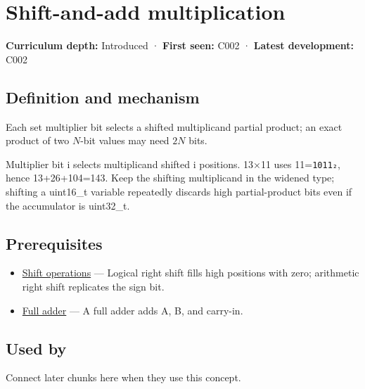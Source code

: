 \hypertarget{appendix-a65290d66ed9}{}\label{referencestart:appendix-a65290d66ed9}
\section{Shift-and-add multiplication}\label{appendix-a65290d66ed9-shift-and-add-multiplication}

\textbf{Curriculum depth:} Introduced · \textbf{First seen:} C002 · \textbf{Latest development:} C002

\begin{allmightroledefinition}

\subsection{Definition and mechanism}\label{appendix-a65290d66ed9-definition-and-mechanism}

Each set multiplier bit selects a shifted multiplicand partial product; an exact product of two \(N\)-bit values may need \(2N\) bits.

\end{allmightroledefinition}

Multiplier bit i selects multiplicand shifted i positions. 13×11 uses 11=\texttt{1011₂}, hence 13+26+104=143. Keep the shifting multiplicand in the widened type; shifting a uint16\_t variable repeatedly discards high partial-product bits even if the accumulator is uint32\_t.

\subsection{Prerequisites}\label{appendix-a65290d66ed9-prerequisites}

\begin{itemize}
\tightlist
\item
  \hyperref[appendix-73425b25118e]{Shift operations} --- Logical right shift fills high positions with zero; arithmetic right shift replicates the sign bit.
\item
  \hyperref[appendix-d1a5b1e520c2]{Full adder} --- A full adder adds A, B, and carry-in.
\end{itemize}

\subsection{Used by}\label{appendix-a65290d66ed9-used-by}

Connect later chunks here when they use this concept.

